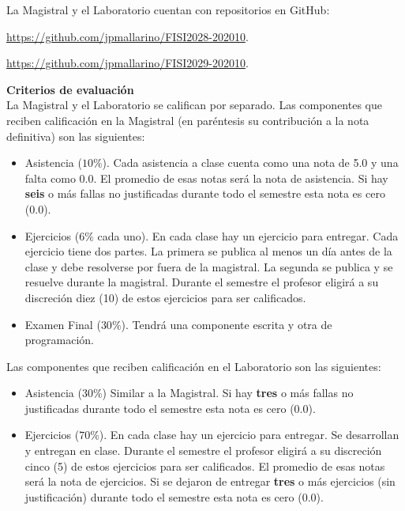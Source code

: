 \documentclass[letterpaper,10pt,onecolumn]{article}
\begin{document}
La Magistral y el Laboratorio cuentan con repositorios  en GitHub:

\url{https://github.com/jpmallarino/FISI2028-202010}. 

\url{https://github.com/jpmallarino/FISI2029-202010}. 


\vspace*{0.5cm} 
\noindent\textbf{\large {} \quad Criterios de
  evaluaci\'on}\\[-0.2cm] 

La Magistral y el Laboratorio se califican por separado. 
Las componentes que reciben calificaci\'on en la Magistral (en
par\'entesis su contribuci\'on a la nota definitiva) son las
siguientes:  

\begin{itemize}
\item Asistencia ($10\%$). Cada asistencia a clase cuenta como una
  nota de 5.0 y una falta como 0.0. El promedio de esas notas ser\'a
  la nota de asistencia. 
  Si hay {\bf seis} o m\'as fallas no justificadas durante todo el
  semestre esta nota es cero (0.0).
\item Ejercicios ($6\%$ cada uno). En cada clase hay un ejercicio para
  entregar. Cada ejercicio tiene dos partes. 
  La primera se publica al menos un d\'ia antes de la clase y debe
  resolverse por fuera de la magistral. 
  La segunda se publica y se resuelve durante la magistral.
  Durante el semestre el profesor eligir\'a a su discreci\'on diez (10)
  de estos ejercicios para ser calificados. 
\item Examen Final ($30\%$). Tendr\'a una componente escrita y otra de
  programaci\'on. 
\end{itemize}

Las componentes que reciben calificaci\'on en el Laboratorio son las
siguientes:
\begin{itemize}
\item Asistencia ($30\%$) Similar a la Magistral.
  Si hay {\bf tres} o m\'as fallas no justificadas durante todo el
  semestre esta nota es cero (0.0).
\item Ejercicios ($70\%$). En cada clase hay un ejercicio para
  entregar. Se desarrollan y entregan en clase.
  Durante el semestre el profesor eligir\'a a su discreci\'on cinco
  (5) de estos ejercicios para ser calificados.
  El promedio de esas notas ser\'a la nota de ejercicios.
  Si se dejaron de entregar {\bf tres} o m\'as ejercicios (sin
  justificaci\'on) durante todo el semestre esta nota es
  cero (0.0). 
\end{itemize}
\end{document}
